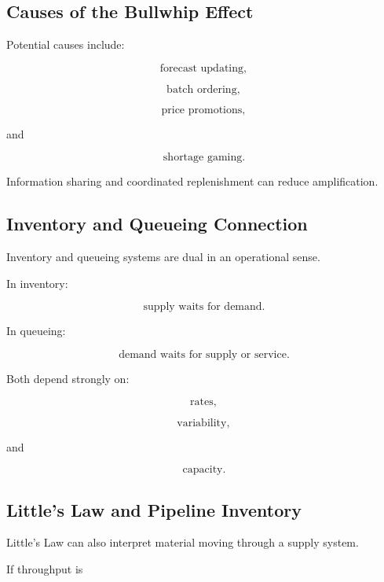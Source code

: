 \subsection{Causes of the Bullwhip Effect}
\label{subsec:bullwhip-causes}

Potential causes include:

\[
\boxed{
\text{forecast updating},
}
\]

\[
\boxed{
\text{batch ordering},
}
\]

\[
\boxed{
\text{price promotions},
}
\]

and

\[
\boxed{
\text{shortage gaming}.
}
\]

Information sharing and coordinated replenishment can reduce amplification.

\subsection{Inventory and Queueing Connection}
\label{subsec:inventory-queueing-connection}

Inventory and queueing systems are dual in an operational sense.

In inventory:

\[
\boxed{
\text{supply waits for demand}.
}
\]

In queueing:

\[
\boxed{
\text{demand waits for supply or service}.
}
\]

Both depend strongly on:

\[
\boxed{
\text{rates},
}
\]

\[
\boxed{
\text{variability},
}
\]

and

\[
\boxed{
\text{capacity}.
}
\]

\subsection{Little's Law and Pipeline Inventory}
\label{subsec:littles-law-pipeline-inventory}

Little's Law can also interpret material moving through a supply system.

If throughput is

